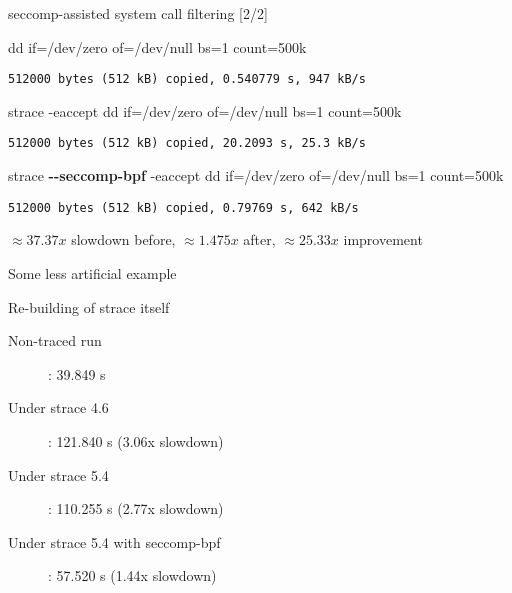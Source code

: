 \documentclass[unicode]{beamer}
\begin{document}
\begin{frame}[fragile]{seccomp-assisted system call filtering \hfill [2/2]}
\begin{block}{\large dd if=/dev/zero of=/dev/null bs=1 count=500k}
\begin{verbatim}
512000 bytes (512 kB) copied, 0.540779 s, 947 kB/s
\end{verbatim}
\end{block}
\begin{block}{\large strace -eaccept dd if=/dev/zero of=/dev/null bs=1 count=500k}
\begin{verbatim}
512000 bytes (512 kB) copied, 20.2093 s, 25.3 kB/s
\end{verbatim}
\end{block}
\begin{block}{\large strace \textbf{-{}-seccomp-bpf} -eaccept dd if=/dev/zero of=/dev/null bs=1 count=500k}
\begin{verbatim}
512000 bytes (512 kB) copied, 0.79769 s, 642 kB/s
\end{verbatim}
\end{block}
$\approx 37.37x$ slowdown before, $\approx 1.475x$ after, $\approx 25.33x$ improvement
\end{frame}

\begin{frame}[fragile]{Some less artificial example}
\begin{block}{\large Re-building of strace itself\footnotemark[1]}
\begin{description}
  \item[Non-traced run]: 39.849 s
  \item[Under strace 4.6]: 121.840 s (3.06x slowdown)
  \item[Under strace 5.4]: 110.255 s (2.77x slowdown)
  \item[Under strace 5.4 with seccomp-bpf]: 57.520 s (1.44x slowdown)
\end{description}
\end{block}
\end{frame}
\end{document}
